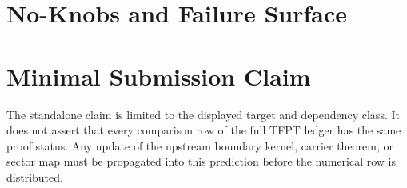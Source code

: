 \documentclass[11pt,a4paper]{article}
\begin{document}
\section{No-Knobs and Failure Surface}

\section{Minimal Submission Claim}
The standalone claim is limited to the displayed target and dependency class. It does not assert
that every comparison row of the full TFPT ledger has the same proof status. Any update of the
upstream boundary kernel, carrier theorem, or sector map must be propagated into this prediction
before the numerical row is distributed.

\PredictionBibliography
\end{document}
